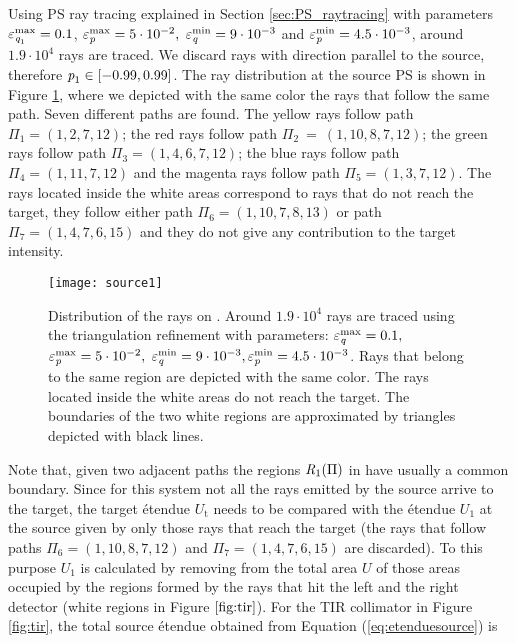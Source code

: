 Using PS ray tracing explained in Section \ref{sec:PS_raytracing} with parameters $\varepsilon_{\textit{q}_1}^{\textrm{max}} = 0.1$, $ \varepsilon_{\textit{p}}^\textrm{max} = 5\cdot 10^{-2}, $ $\varepsilon_{\textit{q}}^\textrm{min} = 9\cdot 10^{-3}$ and $\varepsilon_{\textit{p}}^\textrm{min} = 4.5 \cdot 10^{-3}$, around $1.9 \cdot 10^4$ rays are traced. 
We discard rays with direction parallel to the source, therefore $\textit{p}_1 \in [-0.99, 0.99]$. The ray distribution at the source PS  is shown in Figure \ref{fig:sourcePS}, where we depicted with the same color the rays that follow the same path. Seven different paths are found. The yellow rays follow path $\Pi_1 = (1, 2, 7, 12)$;
   the red rays follow path $\Pi_2 ~= ~(1, 10, 8, 7, 12)$; the green rays follow path $\Pi_3 = (1, 4, 6, 7, 12)$;
   the blue rays follow path $\Pi_4= (1, 11, 7, 12)$ and the magenta rays follow path $\Pi_5= (1, 3, 7, 12)$. The rays located inside the white areas correspond to rays that do not reach the target, they follow either path $\Pi_6 = (1, 10, 7, 8, 13)$ or path $\Pi_7 = (1,4,7,6,15)$ and they do not give any contribution to the target intensity.
\begin{figure}[h]
  \begin{center}
  \texttt{[image: source1]}
  \end{center}
  \caption{Distribution of the rays on . Around $1.9 \cdot 10^4$ rays are traced using the triangulation refinement with parameters:
  $\varepsilon_{\textit{q}}^\textrm{max} = 0.1 ,$ $ \varepsilon_{\textit{p}}^\textrm{max} = 5\cdot 10^{-2}, $ $\varepsilon_{\textit{q}}^\textrm{min} = 9\cdot 10^{-3}, \varepsilon_{\textit{p}}^\textrm{min} = 4.5 \cdot 10^{-3}$. Rays that belong to the same region are depicted with the same color. The rays located inside the white areas do not reach the target. The boundaries of the two white regions are approximated by triangles depicted with black lines.}
  \label{fig:sourcePS}
\end{figure}
Note that, given two adjacent paths the regions $\mbox{$\emph{R}_{\textit{$1$}}$}(\Pi)$ in  have usually a common boundary. 
Since for this system not all the rays emitted by the source arrive to the target, the target \'{e}tendue $U_{\textrm{t}}$ needs to be compared with the \'{e}tendue $U_1$ at the source given by only those rays that reach the target (the rays that follow paths $\Pi_6=(1,10,8,7,12)$ and 
$\Pi_7 = (1,4,7,6,15)$ are discarded). To this purpose $U_1$ is calculated by removing from the total area $U$ of  those areas occupied by the regions formed by the rays that hit the left and the right detector (white regions in Figure $\ref{fig:tir}$).  For the TIR collimator in Figure \ref{fig:tir}, the total source  \'{e}tendue obtained from Equation (\ref{eq:etenduesource}) is
